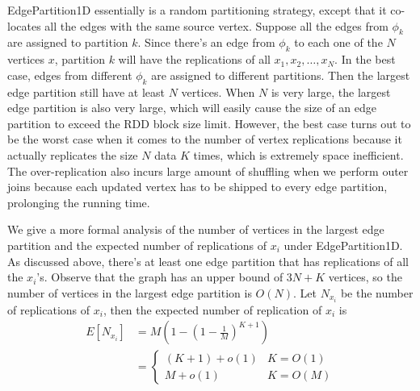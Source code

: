 EdgePartition1D essentially is a random partitioning strategy, except that it
co-locates all the edges with the same source vertex. Suppose all the edges from
$\phi_k$ are assigned to partition $k$. Since there's an edge from $\phi_k$ to
each one of the $N$ vertices $x$, partition $k$ will have the replications
of all $x_1, x_2, \ldots, x_N$. In the best case, 
edges from different $\phi_k$ are assigned to different
partitions. Then the largest edge partition still have at least $N$ vertices.
When $N$ is very large, the largest edge partition is also very large, which
will easily cause the size of an edge partition to exceed the RDD block size limit. However,
the best case turns out to be the worst case 
when it comes to the number of vertex replications
because it actually replicates the size $N$ data $K$ times, which is
extremely space inefficient. The over-replication also incurs large amount of
shuffling when we perform outer joins because each updated vertex has to
be shipped to every edge partition, prolonging the running time. 

We give a more formal analysis of the number of vertices in the largest edge
partition and the expected number of replications of $x_i$ under
EdgePartition1D. As discussed above, there's at least one edge partition that
has replications of all the $x_i$'s. 
Observe that the graph has an upper bound of
$3N + K$ vertices, so the number of vertices in the largest edge partition is
$O(N)$. Let $N_{x_i}$ be the number of replications of $x_i$, then the expected
number of replication of $x_i$ is 
\begin{align*}
	E[N_{x_i}] &= M(1 - (1 - \frac{1}{M})^{K+1}) \\
		&= \left\{
			\begin{array}{ll}
				(K + 1) + o(1) & K = O(1) \\
				M + o(1) & K = O(M) 
			\end{array}
		\right.%
\end{align*}



